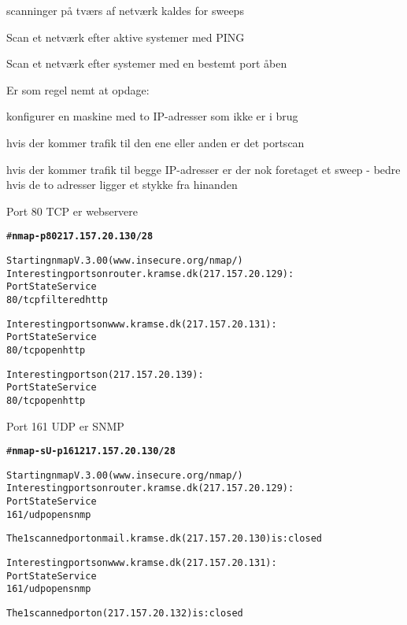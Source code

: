 \documentclass[Screen16to9,17pt]{foils}
\begin{document}
\begin{list1}
\item scanninger på tværs af netværk kaldes for sweeps
\item Scan et netværk efter aktive systemer med PING
\item Scan et netværk efter systemer med en bestemt port åben
\item Er som regel nemt at opdage:
  \begin{list2}
    \item konfigurer en maskine med to IP-adresser som ikke er i brug
\item hvis der kommer trafik til den ene eller anden er det portscan
\item hvis der kommer trafik til begge IP-adresser er der nok
  foretaget et sweep - bedre hvis de to adresser ligger et stykke fra hinanden
  \end{list2}

\end{list1}


\begin{list1}
  \item Port 80 TCP er webservere
\end{list1}

\begin{alltt}
\small # {\bfseries nmap  -p 80 217.157.20.130/28}

Starting nmap V. 3.00 ( www.insecure.org/nmap/ )
Interesting ports on router.kramse.dk (217.157.20.129):
Port       State       Service
80/tcp     filtered    http

Interesting ports on www.kramse.dk (217.157.20.131):
Port       State       Service
80/tcp     open        http

Interesting ports on  (217.157.20.139):
Port       State       Service
80/tcp     open        http

\end{alltt}


\begin{list1}
  \item Port 161 UDP er SNMP
\end{list1}

\begin{alltt}
\small # {\bfseries nmap -sU -p 161 217.157.20.130/28}

Starting nmap V. 3.00 ( www.insecure.org/nmap/ )
Interesting ports on router.kramse.dk (217.157.20.129):
Port       State       Service
161/udp    open        snmp

The 1 scanned port on mail.kramse.dk (217.157.20.130) is: closed

Interesting ports on www.kramse.dk (217.157.20.131):
Port       State       Service
161/udp    open        snmp

The 1 scanned port on  (217.157.20.132) is: closed
\end{alltt}
\end{document}
